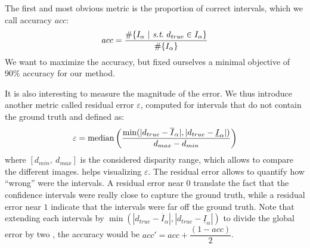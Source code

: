 The first and most obvious metric is the proportion of correct intervals, which we call accuracy $acc$:
\begin{align}
    acc = \dfrac{\#\{I_\alpha ~|~ \st ~d_{true}\in I_\alpha\}}{\#\{I_\alpha\}}
\end{align}
We want to maximize the accuracy, but fixed ourselves a minimal objective of $90\%$ accuracy for our method.

It is also interesting to measure the magnitude of the error. We thus introduce another metric called residual error $\varepsilon$, computed for intervals that do not contain the ground truth and defined as:
\begin{align}
    \varepsilon=\operatorname*{median} \left( \dfrac{\min(|d_{true}-\overline{I}_\alpha|, |d_{true}-\underline{I}_\alpha|)}{d_{max}-d_{min}}\right)\label{eq:residual_error}
\end{align}
where $[d_{min}, ~d_{max}]$ is the considered disparity range, which allows to compare the different images.  helps visualizing $\varepsilon$. The residual error allows to quantify how ``wrong'' were the intervals. A residual error near $0$ translate the fact that the confidence intervals were really close to capture the ground truth, while a residual error near $1$ indicate that the intervals were far off the ground truth. Note that extending each intervals by $\min(|d_{true}-\overline{I}_\alpha|, |d_{true}-\underline{I}_\alpha|)$ to divide the global error by two \ie, the accuracy would be $acc'=acc+\dfrac{(1-acc)}{2}$.

